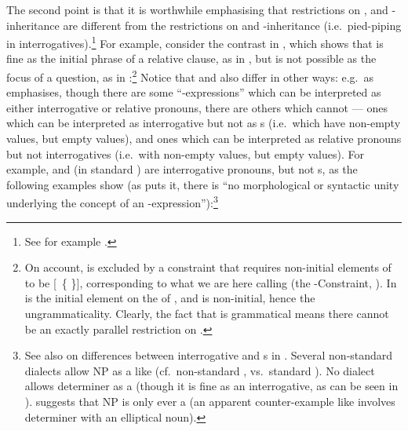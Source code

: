 \documentclass[output=paper
 	        ,biblatex
                ,babelshorthands
                ,newtxmath
                ,draftmode
                ,colorlinks, citecolor=brown
]{langscibook}
\begin{document}
The second point is that it is worthwhile emphasising that restrictions on , and
-inheritance are different from the restrictions on  and
-inheritance (i.e.\ pied-piping in interrogatives).\footnote{See for example
  \cite[578--586]{Horvath05BSC}.} For example, consider the contrast in ,
which shows that  is fine as the initial phrase of a relative
clause, as in , but is not possible as the focus of a question, as in
:\footnote{On  account,  is excluded
  by a constraint that requires non-initial elements of  to be
  [~\{ \}],  corresponding to what we are here calling  (the
  -Constraint, \citealt[189]{Ginzburg:Sag:00}). In   is
  the initial element on the  of , and  is
  non-initial, hence the ungrammaticality. Clearly, the fact that  is
  grammatical means there cannot be an exactly parallel
  restriction on .}
\eal\label{x:rc-2930}
\zl
Notice that  and  also differ in other ways: e.g.\ as
\cite[490--493]{Sag:10b} emphasises, though there are some ``-expressions'' which
can be interpreted as either interrogative or relative pronouns, there are others which
cannot --- ones which can be interpreted as interrogative but not as s (i.e.\ which have non-empty  values, but empty  values),
and ones which can be interpreted as relative pronouns but not interrogatives (i.e.\ with
non-empty  values, but empty  values). For example,  and (in
standard )  are interrogative pronouns, but not s, as the following examples show (as \citealt[493]{Sag:10b} puts it, there is
``no morphological or syntactic unity underlying the concept of an 
-expression''):\footnote{See also \cite[81--85]{Mueller99b} on differences between
  interrogative and s in . Several non-standard
   dialects allow NP  as a  like 
  (cf.\ non-standard , vs.\ standard ). No dialect allows determiner  as a 
  (though it is fine as an interrogative, as can be seen in ). \cite[491,
  note 10]{Sag:10b} suggests that NP  is only ever a  (an
  apparent counter-example like   involves determiner 
  with an elliptical noun).}
\end{document}
